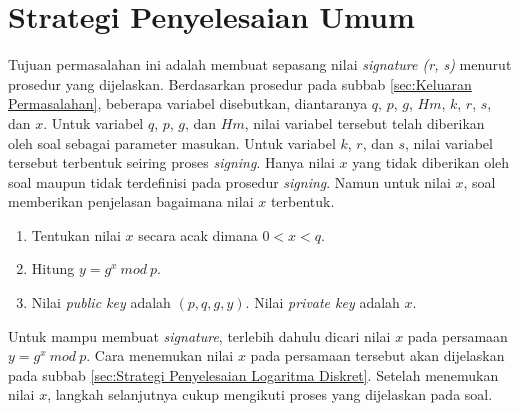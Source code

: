 \section {Strategi Penyelesaian Umum}
Tujuan permasalahan ini adalah membuat sepasang nilai \textit{signature (r, s)} menurut prosedur yang dijelaskan. Berdasarkan prosedur pada subbab \ref{sec:Keluaran Permasalahan}, beberapa variabel disebutkan, diantaranya $q$, $p$, $g$, $Hm$, $k$, $r$, $s$, dan $x$. Untuk variabel $q$, $p$, $g$, dan $Hm$, nilai variabel tersebut telah diberikan oleh soal sebagai parameter masukan. Untuk variabel $k$, $r$, dan $s$, nilai variabel tersebut terbentuk seiring proses \textit{signing}. Hanya nilai $x$ yang tidak diberikan oleh soal maupun tidak terdefinisi pada prosedur \textit{signing}. Namun untuk nilai $x$, soal memberikan penjelasan bagaimana nilai $x$ terbentuk.
\begin{enumerate}
\item Tentukan nilai $x$ secara acak dimana $0 < x < q$.
\item Hitung $y = g^x\ mod\ p$.
\item Nilai \textit{public key} adalah $(p, q, g, y)$. Nilai \textit{private key} adalah $x$.
\end{enumerate}
Untuk mampu membuat \textit{signature}, terlebih dahulu dicari nilai $x$ pada persamaan $y=g^x\ mod\ p$. Cara menemukan nilai $x$ pada persamaan tersebut akan dijelaskan pada subbab \ref{sec:Strategi Penyelesaian Logaritma Diskret}. Setelah menemukan nilai $x$, langkah selanjutnya cukup mengikuti proses yang dijelaskan pada soal.

